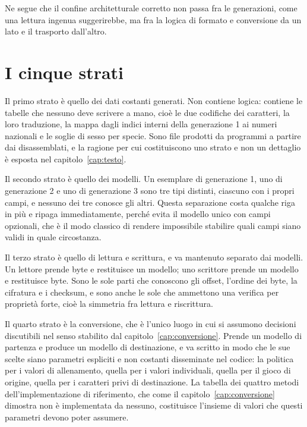 Ne segue che il confine architetturale corretto non passa fra le generazioni, come una lettura ingenua suggerirebbe, ma fra la logica di formato e conversione da un lato e il trasporto dall'altro.

\section{I cinque strati}

Il primo strato è quello dei dati costanti generati. Non contiene logica: contiene le tabelle che nessuno deve scrivere a mano, cioè le due codifiche dei caratteri, la loro traduzione, la mappa dagli indici interni della generazione 1 ai numeri nazionali e le soglie di sesso per specie. Sono file prodotti da programmi a partire dai disassemblati, e la ragione per cui costituiscono uno strato e non un dettaglio è esposta nel capitolo~\ref{cap:testo}.

Il secondo strato è quello dei modelli. Un esemplare di generazione 1, uno di generazione 2 e uno di generazione 3 sono tre tipi distinti, ciascuno con i propri campi, e nessuno dei tre conosce gli altri. Questa separazione costa qualche riga in più e ripaga immediatamente, perché evita il modello unico con campi opzionali, che è il modo classico di rendere impossibile stabilire quali campi siano validi in quale circostanza.

Il terzo strato è quello di lettura e scrittura, e va mantenuto separato dai modelli. Un lettore prende byte e restituisce un modello; uno scrittore prende un modello e restituisce byte. Sono le sole parti che conoscono gli offset, l'ordine dei byte, la cifratura e i checksum, e sono anche le sole che ammettono una verifica per proprietà forte, cioè la simmetria fra lettura e riscrittura.

Il quarto strato è la conversione, che è l'unico luogo in cui si assumono decisioni discutibili nel senso stabilito dal capitolo~\ref{cap:conversione}. Prende un modello di partenza e produce un modello di destinazione, e va scritto in modo che le sue scelte siano parametri espliciti e non costanti disseminate nel codice: la politica per i valori di allenamento, quella per i valori individuali, quella per il gioco di origine, quella per i caratteri privi di destinazione. La tabella dei quattro metodi dell'implementazione di riferimento, che come il capitolo~\ref{cap:conversione} dimostra non è implementata da nessuno, costituisce l'insieme di valori che questi parametri devono poter assumere.

